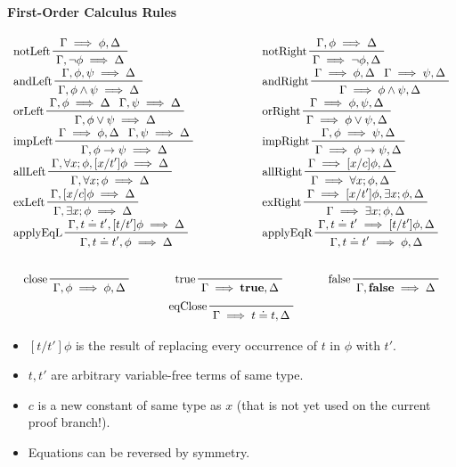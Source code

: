 \documentclass[a4paper, 11pt, accentcolor = tud3b]{tudreport}
\newcommand{\true}{\textbf{true}}
\newcommand{\false}{\textbf{false}}
\begin{document}
				\paragraph{First-Order Calculus Rules}
					\begin{gather*}
						\begin{array}{lcl}
							\prftree[l]{notLeft}{\Gamma \implies \phi, \Delta}{\Gamma, \lnot\phi \implies \Delta} &\quad\quad\quad\quad& \prftree[l]{notRight}{\Gamma, \phi \implies \Delta}{\Gamma \implies \lnot\phi, \Delta} \\
							\prftree[l]{andLeft}{\Gamma, \phi, \psi \implies \Delta}{\Gamma, \phi \land \psi \implies \Delta} && \prftree[l]{andRight}{\Gamma \implies \phi, \Delta}{\Gamma \implies \psi, \Delta}{\Gamma \implies \phi \land \psi, \Delta} \\
							\prftree[l]{orLeft}{\Gamma, \phi \implies \Delta}{\Gamma, \psi \implies \Delta}{\Gamma, \phi \lor \psi \implies \Delta} && \prftree[l]{orRight}{\Gamma \implies \phi, \psi, \Delta}{\Gamma \implies \phi \lor \psi, \Delta} \\
							\prftree[l]{impLeft}{\Gamma \implies \phi, \Delta}{\Gamma, \psi \implies \Delta}{\Gamma, \phi \to \psi \implies \Delta} && \prftree[l]{impRight}{\Gamma, \phi \implies \psi, \Delta}{\Gamma \implies \phi \to \psi, \Delta} \\
							\prftree[l]{allLeft}{\Gamma, \forall x; \phi, [x/t']\phi \implies \Delta}{\Gamma, \forall x; \phi \implies \Delta} && \prftree[l]{allRight}{\Gamma \implies [x/c]\phi, \Delta}{\Gamma \implies \forall x; \phi, \Delta} \\
							\prftree[l]{exLeft}{\Gamma, [x/c]\phi \implies \Delta}{\Gamma, \exists x; \phi \implies \Delta} && \prftree[l]{exRight}{\Gamma \implies [x/t']\phi, \exists x; \phi, \Delta}{\Gamma \implies \exists x; \phi, \Delta} \\
							\prftree[l]{applyEqL}{\Gamma, t \doteq t', [t/t']\phi \implies \Delta}{\Gamma, t \doteq t', \phi \implies \Delta} && \prftree[l]{applyEqR}{\Gamma, t \doteq t' \implies [t/t']\phi, \Delta}{\Gamma, t \doteq t' \implies \phi, \Delta}
						\end{array} \\\\
						\prftree[l]{close}{\Gamma, \phi \implies \phi, \Delta} \quad\quad\quad\quad \prftree[l]{true}{\Gamma \implies \true, \Delta} \quad\quad\quad\quad \prftree[l]{false}{\Gamma, \false \implies \Delta} \\
						\prftree[l]{eqClose}{\Gamma \implies t \doteq t, \Delta}
					\end{gather*}
					\begin{itemize}
						\item \( [t/t']\phi \) is the result of replacing every occurrence of \(t\) in \(\phi\) with \(t'\).
						\item \( t, t' \) are arbitrary variable-free terms of same type.
						\item \( c \) is a new constant of same type as \(x\) (that is not yet used on the current proof branch!).
						\item Equations can be reversed by symmetry.
					\end{itemize}
\end{document}
